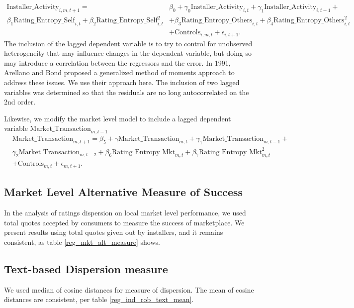 \documentclass[msom,blindrev]{informs3}
\begin{document}
\begin{align} \nonumber
\text{Installer\_Activity}_{i,m,t+1}=&\beta_{0}+\gamma_{0} \text{Installer\_Activity}_{i,t}+\gamma_{1}\text{Installer\_Activity}_{i,t-1}+\\ \nonumber
\beta_{1} \text{Rating\_Entropy\_Self}_{i,t}+\beta_{2} \text{Rating\_Entropy\_Self}_{i,t}^ {2}
&+\beta_{3} \text{Rating\_Entropy\_Others}_{i,t}  +\beta_{4}\text{Rating\_Entropy\_Others}_{i,t}^{2} \\
&+ \text{Controls}_{i,m,t}+ \epsilon_{i,t+1}.
\end{align}
The inclusion of the lagged dependent variable is to try to control for unobserved heterogeneity that may influence changes in the dependent variable, but doing so may introduce a correlation between the regressors and the error. In 1991, Arellano and Bond proposed a generalized method of moments approach to address these issues. We use their approach here. The inclusion of two lagged variables was determined so that the residuals are no long autocorrelated on the 2nd order. 
 
 
Likewise, we modify the market level model to include a lagged dependent variable $\text{Market\_Transaction}_{m,t-1}$\\
\begin{align} \nonumber&
\text{Market\_Transaction}_{m,t+1}=\beta_{5}+\gamma \text{Market\_Transaction}_{m,t}+\gamma_{1}\text{Market\_Transaction}_{m,t-1}+\\\nonumber&
\gamma_{2} \text{Market\_Transaction}_{m,t-2}+\beta_{6}\text{Rating\_Entropy\_Mkt}_{m,t}+ \beta_{7}\text{Rating\_Entropy\_Mkt}_{m,t} ^2\\\nonumber
&+ \text{Controls}_{m,t}  +\epsilon_{m,t+1}.
\end{align}
\clearpage



\subsection{Market Level Alternative Measure of Success}

In the analysis of ratings dispersion on local market level performance, we used total quotes accepted by consumers to measure the success of marketplace. We present results using total quotes given out by installers, and it remains consistent, as table \ref{reg_mkt_alt_measure} shows.

\subsection{Text-based Dispersion measure}

We used median of cosine distances for measure of dispersion. The mean of cosine distances are consistent, per table \ref{reg_ind_rob_text_mean}.
\end{document}
